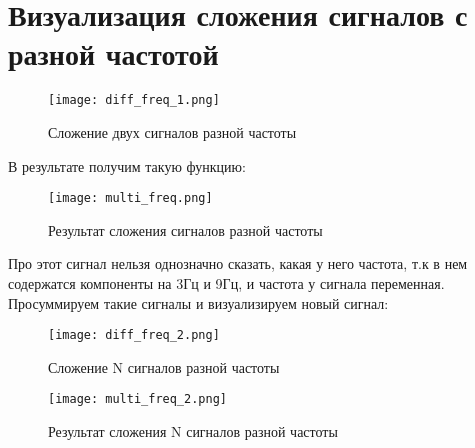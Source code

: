 \chapter{Визуализация сложения сигналов с разной частотой}
\label{ch:chap4}

\begin{figure}[ht]
    \centering
    \texttt{[image: diff\_freq\_1.png]}
    \caption{Сложение двух сигналов разной частоты}
\end{figure}

В результате получим такую функцию:

\begin{figure}[ht]
    \centering
    \texttt{[image: multi\_freq.png]}
    \caption{Результат сложения сигналов разной частоты}
\end{figure}

Про этот сигнал нельзя однозначно сказать, какая у него частота, т.к в нем содержатся компоненты на 3Гц и 9Гц, и частота у сигнала переменная. \\

Просуммируем такие сигналы и визуализируем новый сигнал:

\begin{figure}[ht]
    \centering
    \texttt{[image: diff\_freq\_2.png]}
    \caption{Сложение N сигналов разной частоты}
\end{figure}

\begin{figure}[ht]
    \centering
    \texttt{[image: multi\_freq\_2.png]}
    \caption{Результат сложения N сигналов разной частоты}
\end{figure}




\endinput
